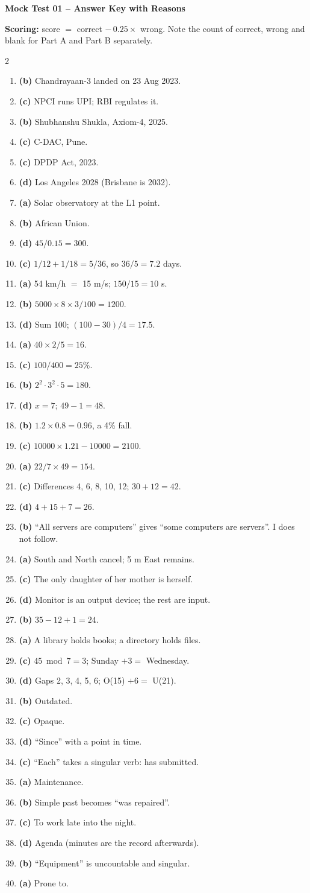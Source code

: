 \documentclass[10pt,a4paper]{article}
\newcommand{\sect}[1]{\vspace{6pt}{\large\bfseries\color{ember}#1}\par\vspace{2pt}{\color{slate}\hrule}\vspace{5pt}}
\newcommand{\ak}[2]{\item \textbf{(#1)} #2}
\begin{document}
\begin{center}{\Large\bfseries\color{slate}Mock Test 01 -- Answer Key with Reasons}\end{center}
\textbf{Scoring:} score $=$ correct $-\,0.25 \times$ wrong. Note the count of correct, wrong and blank for Part A and Part B separately.

\sect{Part A}
\begin{multicols}{2}
\begin{enumerate}
\ak{b}{Chandrayaan-3 landed on 23 Aug 2023.}
\ak{c}{NPCI runs UPI; RBI regulates it.}
\ak{b}{Shubhanshu Shukla, Axiom-4, 2025.}
\ak{c}{C-DAC, Pune.}
\ak{c}{DPDP Act, 2023.}
\ak{d}{Los Angeles 2028 (Brisbane is 2032).}
\ak{a}{Solar observatory at the L1 point.}
\ak{b}{African Union.}
\ak{d}{$45 / 0.15 = 300$.}
\ak{c}{$1/12 + 1/18 = 5/36$, so $36/5 = 7.2$ days.}
\ak{a}{54 km/h $=$ 15 m/s; $150/15 = 10$ s.}
\ak{b}{$5000 \times 8 \times 3 / 100 = 1200$.}
\ak{d}{Sum 100; $(100 - 30)/4 = 17.5$.}
\ak{a}{$40 \times 2/5 = 16$.}
\ak{c}{$100/400 = 25\%$.}
\ak{b}{$2^2 \cdot 3^2 \cdot 5 = 180$.}
\ak{d}{$x = 7$; $49 - 1 = 48$.}
\ak{b}{$1.2 \times 0.8 = 0.96$, a 4\% fall.}
\ak{c}{$10000 \times 1.21 - 10000 = 2100$.}
\ak{a}{$22/7 \times 49 = 154$.}
\ak{c}{Differences 4, 6, 8, 10, 12; $30 + 12 = 42$.}
\ak{d}{$4 + 15 + 7 = 26$.}
\ak{b}{``All servers are computers'' gives ``some computers are servers''. I does not follow.}
\ak{a}{South and North cancel; 5 m East remains.}
\ak{c}{The only daughter of her mother is herself.}
\ak{d}{Monitor is an output device; the rest are input.}
\ak{b}{$35 - 12 + 1 = 24$.}
\ak{a}{A library holds books; a directory holds files.}
\ak{c}{$45 \bmod 7 = 3$; Sunday $+ 3 =$ Wednesday.}
\ak{d}{Gaps 2, 3, 4, 5, 6; O(15) $+ 6 =$ U(21).}
\ak{b}{Outdated.}
\ak{c}{Opaque.}
\ak{d}{``Since'' with a point in time.}
\ak{c}{``Each'' takes a singular verb: has submitted.}
\ak{a}{Maintenance.}
\ak{b}{Simple past becomes ``was repaired''.}
\ak{c}{To work late into the night.}
\ak{d}{Agenda (minutes are the record afterwards).}
\ak{b}{``Equipment'' is uncountable and singular.}
\ak{a}{Prone to.}
\end{enumerate}
\end{multicols}
\end{document}
